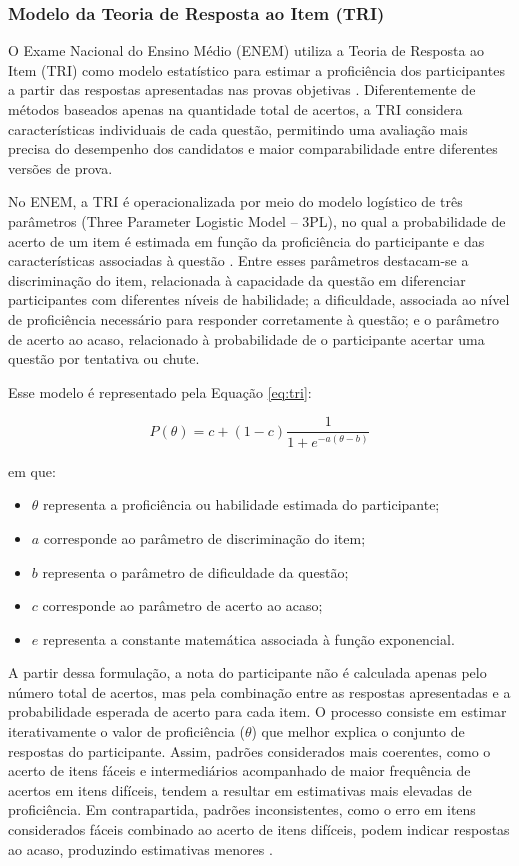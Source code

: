 \documentclass[a4paper,10pt, twocolumn]{article}
\begin{document}
\subsubsection{Modelo da Teoria de Resposta ao Item (TRI)}
\label{sec:tri}

O Exame Nacional do Ensino Médio (ENEM) utiliza a Teoria de Resposta ao Item (TRI) como modelo estatístico para estimar a proficiência dos participantes a partir das respostas apresentadas nas provas objetivas \cite{inep2021enem}. Diferentemente de métodos baseados apenas na quantidade total de acertos, a TRI considera características individuais de cada questão, permitindo uma avaliação mais precisa do desempenho dos candidatos e maior comparabilidade entre diferentes versões de prova.

No ENEM, a TRI é operacionalizada por meio do modelo logístico de três parâmetros (Three Parameter Logistic Model -- 3PL), no qual a probabilidade de acerto de um item é estimada em função da proficiência do participante e das características associadas à questão \cite{sousa_teoria_2020,inep2021enem}. Entre esses parâmetros destacam-se a discriminação do item, relacionada à capacidade da questão em diferenciar participantes com diferentes níveis de habilidade; a dificuldade, associada ao nível de proficiência necessário para responder corretamente à questão; e o parâmetro de acerto ao acaso, relacionado à probabilidade de o participante acertar uma questão por tentativa ou chute.

Esse modelo é representado pela Equação \ref{eq:tri}:

\begin{equation}
P(\theta)=c+(1-c)\frac{1}{1+e^{-a(\theta-b)}}
\label{eq:tri}
\end{equation}

em que:

\begin{itemize}
\item $\theta$ representa a proficiência ou habilidade estimada do participante;
\item $a$ corresponde ao parâmetro de discriminação do item;
\item $b$ representa o parâmetro de dificuldade da questão;
\item $c$ corresponde ao parâmetro de acerto ao acaso;
\item $e$ representa a constante matemática associada à função exponencial.
\end{itemize}

A partir dessa formulação, a nota do participante não é calculada apenas pelo número total de acertos, mas pela combinação entre as respostas apresentadas e a probabilidade esperada de acerto para cada item. O processo consiste em estimar iterativamente o valor de proficiência ($\theta$) que melhor explica o conjunto de respostas do participante. Assim, padrões considerados mais coerentes, como o acerto de itens fáceis e intermediários acompanhado de maior frequência de acertos em itens difíceis, tendem a resultar em estimativas mais elevadas de proficiência. Em contrapartida, padrões inconsistentes, como o erro em itens considerados fáceis combinado ao acerto de itens difíceis, podem indicar respostas ao acaso, produzindo estimativas menores \cite{inep2021enem}.
\end{document}
